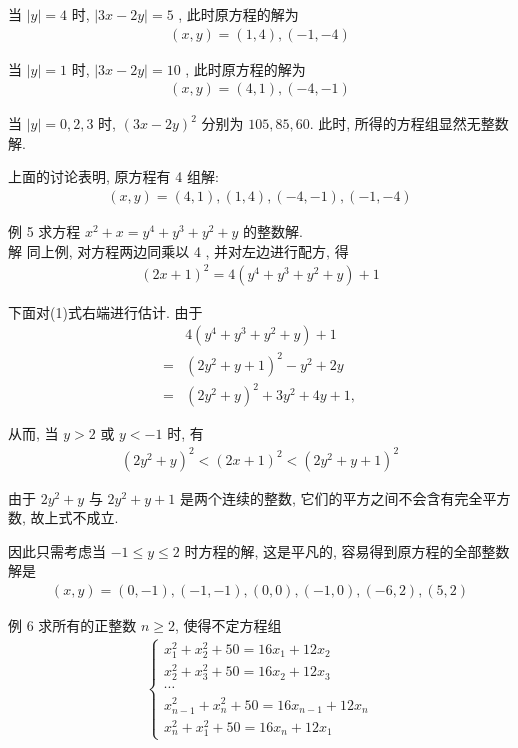 当 $|y|=4$ 时, $|3 x-2 y|=5$ , 此时原方程的解为
\begin{align*}
	(x, y)=(1,4),(-1,-4)
\end{align*}

当 $|y|=1$ 时, $|3 x-2 y|=10$ , 此时原方程的解为
\begin{align*}
	(x, y)=(4,1),(-4,-1)
\end{align*}

当 $|y|=0,2,3$ 时, $(3 x-2 y)^{2}$ 分别为 $105,85,60$. 此时, 所得的方程组显然无整数解.

上面的讨论表明, 原方程有 4 组解:
\begin{align*}
	(x, y)=(4,1),(1,4),(-4,-1),(-1,-4)
\end{align*}

例 5 求方程 $x^{2}+x=y^{4}+y^{3}+y^{2}+y$ 的整数解. \\
解 同上例, 对方程两边同乘以 4 , 并对左边进行配方, 得
\begin{align*}
	(2 x+1)^{2}=4\left(y^{4}+y^{3}+y^{2}+y\right)+1
\end{align*}

下面对(1)式右端进行估计. 由于\begin{align}
	  & 4\left(y^{4}+y^{3}+y^{2}+y\right)+1       \\
	= & \left(2 y^{2}+y+1\right)^{2}-y^{2}+2 y    \\
	= & \left(2 y^{2}+y\right)^{2}+3 y^{2}+4 y+1,
\end{align}

从而, 当 $y>2$ 或 $y<-1$ 时, 有
\begin{align*}
	\left(2 y^{2}+y\right)^{2}<(2 x+1)^{2}<\left(2 y^{2}+y+1\right)^{2}
\end{align*}

由于 $2 y^{2}+y$ 与 $2 y^{2}+y+1$ 是两个连续的整数, 它们的平方之间不会含有完全平方数, 故上式不成立.

因此只需考虑当 $-1 \leqslant y \leqslant 2$ 时方程的解, 这是平凡的, 容易得到原方程的全部整数解是
\begin{align*}
	(x, y)=(0,-1),(-1,-1),(0,0),(-1,0),(-6,2),(5,2)
\end{align*}

例 6 求所有的正整数 $n \geqslant 2$, 使得不定方程组
\begin{align*}
	\left\{\begin{array}{c}
		       x_{1}^{2}+x_{2}^{2}+50=16 x_{1}+12 x_{2}     \\
		       x_{2}^{2}+x_{3}^{2}+50=16 x_{2}+12 x_{3}     \\
		       \cdots                                       \\
		       x_{n-1}^{2}+x_{n}^{2}+50=16 x_{n-1}+12 x_{n} \\
		       x_{n}^{2}+x_{1}^{2}+50=16 x_{n}+12 x_{1}
	       \end{array}\right.
\end{align*}

